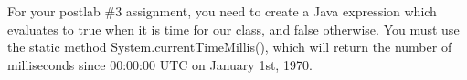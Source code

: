 For your postlab \#3 assignment, you need to create a Java expression which evaluates to true when it is time for our class, and false otherwise. You must use the static method System.currentTimeMillis(), which will return the number of milliseconds since 00:00:00 UTC on January 1st, 1970. 

